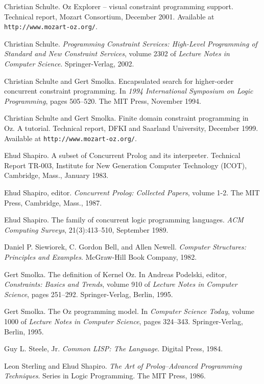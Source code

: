 \begin{thebibliography}{213}
Christian Schulte. Oz Explorer – visual constraint programming support. Technical report, Mozart Consortium, December 2001. Available at \verb"http://www.mozart-oz.org/".

Christian Schulte. \emph{Programming Constraint Services: High-Level Programming of Standard and New Constraint Services}, volume 2302 of \emph{Lecture Notes in Computer Science}. Springer-Verlag, 2002.

Christian Schulte and Gert Smolka. Encapsulated search for higher-order concurrent constraint programming. In \emph{1994 International Symposium on Logic Programming}, pages 505–520. The MIT Press, November 1994.

Christian Schulte and Gert Smolka. Finite domain constraint programming in Oz. A tutorial. Technical report, DFKI and Saarland University, December 1999. Available at \verb"http://www.mozart-oz.org/".

Ehud Shapiro. A subset of Concurrent Prolog and its interpreter. Technical Report TR-003, Institute for New Generation Computer Technology (ICOT), Cambridge, Mass., January 1983.

Ehud Shapiro, editor. \emph{Concurrent Prolog: Collected Papers}, volume 1-2. The MIT Press, Cambridge, Mass., 1987.

Ehud Shapiro. The family of concurrent logic programming languages. \emph{ACM Computing Surveys}, 21(3):413–510, September 1989.

Daniel P. Siewiorek, C. Gordon Bell, and Allen Newell. \emph{Computer Structures: Principles and Examples}. McGraw-Hill Book Company, 1982.

Gert Smolka. The definition of Kernel Oz. In Andreas Podelski, editor, \emph{Constraints: Basics and Trends}, volume 910 of \emph{Lecture Notes in Computer Science}, pages 251–292. Springer-Verlag, Berlin, 1995.

Gert Smolka. The Oz programming model. In \emph{Computer Science Today}, volume 1000 of \emph{Lecture Notes in Computer Science}, pages 324–343. Springer-Verlag, Berlin, 1995.

Guy L. Steele, Jr. \emph{Common LISP: The Language}. Digital Press, 1984.

Leon Sterling and Ehud Shapiro. \emph{The Art of Prolog–Advanced Programming Techniques}. Series in Logic Programming. The MIT Press, 1986.


\end{thebibliography}
